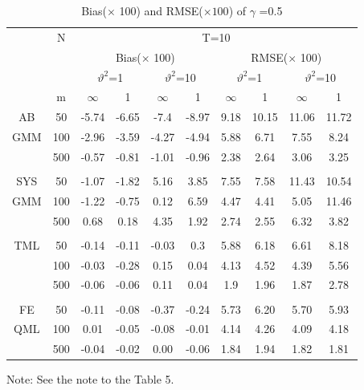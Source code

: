 \documentclass[12pt,a4paper,hyperref]{article}
\begin{document}
\begin{center}
\begin{table}[H]
\caption{Bias($\times$ 100) and RMSE($\times 100$) of $\gamma$ =0.5}  \label{table6}
\centering
\begin{tabular} {*{10}{c}}
\toprule
&N& \multicolumn{8}{c}{T=10}\\
\cmidrule(lr){3-10}
&& \multicolumn{4}{c}{Bias($\times$ 100)} & \multicolumn{4}{c}{RMSE($\times$ 100)}\\
  \cmidrule(lr){3-6} \cmidrule(lr){7-10}
&&  \multicolumn{2}{c}{$\vartheta^{2}$=1}&\multicolumn{2}{c}{$\vartheta^{2}$=10} & \multicolumn{2}{c}{$\vartheta^{2}$=1}&\multicolumn{2}{c}{$\vartheta^{2}$=10}\\
\cmidrule(lr){3-4} \cmidrule(lr){5-6}\cmidrule(lr){7-8}\cmidrule(lr){9-10}
& m & $\infty$ &1&$\infty$ &1&$\infty$ &1&$\infty$&1\\
\cmidrule(lr){3-4} \cmidrule(lr){5-6}\cmidrule(lr){7-8}\cmidrule(lr){9-10}
 AB&50 &	-5.74&-6.65&-7.4&-8.97&9.18&10.15&11.06	&11.72  \\
  GMM&100 &-2.96& -3.59&-4.27& -4.94& 5.88& 6.71&7.55&8.24\\
&500 &	-0.57&	-0.81	&	-1.01&	-0.96&	2.38&2.64	&3.06&	3.25\\
\midrule \\
\cmidrule(lr){3-4} \cmidrule(lr){5-6}\cmidrule(lr){7-8}\cmidrule(lr){9-10}
SYS &50 &	-1.07	&-1.82	&5.16&3.85	&	7.55	&7.58&	11.43&10.54  \\
 GMM&100 &-1.22 &-0.75 &0.12 &6.59 & 4.47& 4.41&5.05 & 11.46\\
&500 &	0.68&	0.18&	4.35&	1.92	&2.74&	2.55&	6.32	&3.82  \\
 \midrule \\
\cmidrule(lr){3-4} \cmidrule(lr){5-6}\cmidrule(lr){7-8}\cmidrule(lr){9-10}
 TML&50 &	-0.14&		-0.11	&-0.03	&0.3&	5.88&6.18	&	6.61&	8.18\\
 &100 &-0.03 & -0.28&0.15 &0.04 &4.13 & 4.52& 4.39&5.56\\
 &500 	&-0.06	&-0.06&	0.11&	0.04&1.9&	1.96&	1.87	&2.78  \\
 \midrule \\
\cmidrule(lr){3-4} \cmidrule(lr){5-6}\cmidrule(lr){7-8}\cmidrule(lr){9-10}
 FE&50 & -0.11	&-0.08&	-0.37	&-0.24	&5.73	&6.20	&5.70	&5.93
\\
  QML&100 & 0.01	&-0.05	&-0.08&	-0.01	&4.14&	4.26&	4.09	&4.18
\\
 &500 &-0.04&	-0.02	&0.00	&-0.06	&1.84&	1.94&	1.82&	1.81
  \\
\bottomrule
\end{tabular}
\begin{tablenotes}
      \small
      \item Note: See the note to the Table 5.
    \end{tablenotes}
\end{table}
\end{center}
\end{document}
